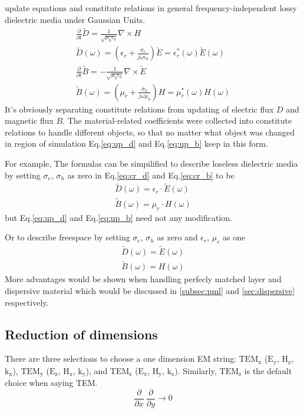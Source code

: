 update equations and constitute relations in general frequency-independent lossy dielectric media under Gaussian Units.
\begin{gather}
  \frac{\partial}{\partial t}\widetilde{D} = \frac{1}{\sqrt{\mu_0\epsilon_0}}\nabla\times H\label{eq:up_d}\\
  \widetilde{D}(\omega) = \left(\epsilon_r + \frac{\sigma_e}{j\omega\epsilon_0}\right)\widetilde{E} = \epsilon_r^*(\omega)\widetilde{E}(\omega)\label{eq:cr_d}\\
  \frac{\partial}{\partial t}\widetilde{B} = -\frac{1}{\sqrt{\mu_0\epsilon_0}}\nabla\times\widetilde{E}\label{eq:up_b}\\
  \widetilde{B}(\omega) = \left(\mu_r + \frac{\sigma_h}{j\omega\mu_0}\right)H = \mu_r^*(\omega)H(\omega)\label{eq:cr_b}
\end{gather}
It's obviously separating constitute relations from updating of electric flux $D$ and magnetic flux $B$. The
material-related coefficients were collected into constitute relations to handle different objects, so that no matter
what object was changed in region of simulation Eq.\ref{eq:up_d} and Eq.\ref{eq:up_b} keep in this form.  

For example, The formulas can be simpilified to describe loseless dielectric media by setting $\sigma_e$, $\sigma_h$ as
zero in Eq.\ref{eq:cr_d} and Eq.\ref{eq:cr_b} to be
\begin{gather*}
  \widetilde{D}(\omega) = \epsilon_r\cdot\widetilde{E}(\omega)\\
  \widetilde{B}(\omega) = \mu_r\cdot H(\omega)
\end{gather*}
but Eq.\ref{eq:up_d} and Eq.\ref{eq:up_b} need not any modification.

Or to describe freespace by setting $\sigma_e$, $\sigma_h$ as zero and $\epsilon_r$, $\mu_r$ as one 
\begin{gather*}
  \widetilde{D}(\omega) = \widetilde{E}(\omega)\\
  \widetilde{B}(\omega) = H(\omega)
\end{gather*}
More advantages would be shown when handling perfecly matched layer and dispersive material which would be discussed in \ref{subsec:pml} and
\ref{sec:dispersive} respectively.

\subsection{Reduction of dimensions}
There are three selections to choose a one dimension EM string: $\mathrm{TEM_x}$ ($\mathrm{E_{y}}$, $\mathrm{H_{z}}$,
$\mathrm{k_x}$), $\mathrm{TEM_y}$ ($\mathrm{E_z}$, $\mathrm{H_x}$, $\mathrm{k_y}$), and $\mathrm{TEM_z}$
($\mathrm{E_x}$, $\mathrm{H_y}$, $\mathrm{k_z}$). Similarly, $\mathrm{TEM_z}$ is the default choice when saying TEM.
\begin{displaymath}
  \frac{\partial}{\partial x}\ \frac{\partial}{\partial y} \rightarrow 0
\end{displaymath}

